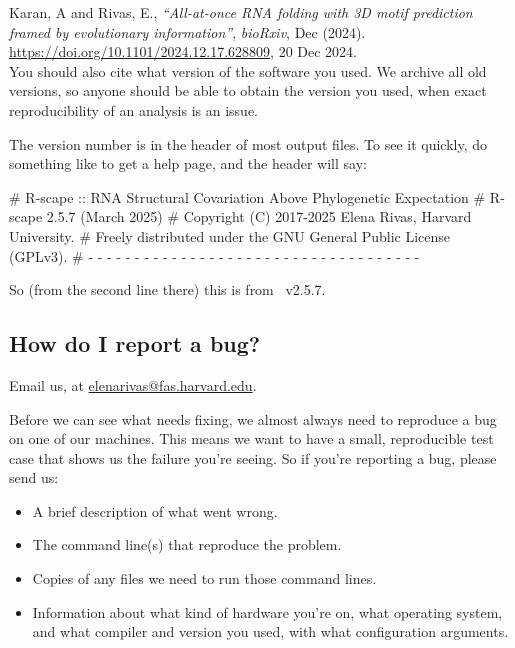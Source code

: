 Karan, A and Rivas, E., \textit{``All-at-once RNA folding with 3D motif prediction framed by evolutionary information''},
\textit{bioRxiv}, Dec (2024).\\
\url{https://doi.org/10.1101/2024.12.17.628809}, 20 Dec 2024.\\


You should also cite what version of the software you used. We archive
all old versions, so anyone should be able to obtain the version you
used, when exact reproducibility of an analysis is an issue.

The version number is in the header of most output files. To see it
quickly, do something like  to get a help page, and
the header will say:

\begin{sreoutput}
# R-scape :: RNA Structural Covariation Above Phylogenetic Expectation
# R-scape 2.5.7 (March 2025)
# Copyright (C) 2017-2025 Elena Rivas, Harvard University.
# Freely distributed under the GNU General Public License (GPLv3).
# - - - - - - - - - - - - - - - - - - - - - - - - - - - - - - - - - - - -
\end{sreoutput}

So (from the second line there) this is from \rscape\ v2.5.7.

\subsection{How do I report a bug?}

Email us, at \url{elenarivas@fas.harvard.edu}.

Before we can see what needs fixing, we almost always need to
reproduce a bug on one of our machines. This means we want to have a
small, reproducible test case that shows us the failure you're seeing.
So if you're reporting a bug, please send us:

\begin{itemize}
 \item A brief description of what went wrong.
 \item The command line(s) that reproduce the problem.
 \item Copies of any files we need to run those command lines.
 \item Information about what kind of hardware you're on, what
   operating system, and what compiler and version you used, with what
   configuration arguments.
\end{itemize}



